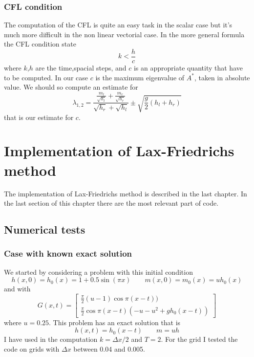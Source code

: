 \documentclass[oneside,12pt]{book}  %
\theoremstyle{plain}
\theoremstyle{definition}
\theoremstyle{remark}
\numberwithin{equation}{chapter} %
\begin{document}
\subsection{CFL condition}
The computation of the CFL is quite an easy task in the scalar case
but it's much more difficult in the non linear vectorial case. In the
more general formula the CFL condition state 
\begin{equation}
  \label{eq:cfl_condition}
  k<\frac{h}{c}
\end{equation}
where $k$,$h$ are the time,spacial steps, and $c$ is an appropriate
quantity that have to be computed. In our case $c$ is the maximum
eigenvalue of $A^*$, taken in absolute value. 
We should so compute an estimate for
\begin{equation}
  \label{eq:eiganvalues_bounded}
  \lambda_{1,2} = \frac{\frac{m_l}{\sqrt{h_l}}+\frac{m_r}{\sqrt{h_r}}
  }{\sqrt{h_r}+\sqrt{h_l}}\pm\sqrt{\frac{g}{2}(h_l+h_r)}
\end{equation}
that is our estimate for $c$. 



\chapter{Implementation of Lax-Friedrichs method}
\label{chap:1}
The implementation of Lax-Friedrichs method is described in the last
chapter. In the last section of this chapter there are the most relevant part of code.

\section{Numerical tests}
\subsection{Case with known exact solution}
\label{subsection:1_b}
We started by considering a problem with this initial condition
\begin{equation}
  \label{eq:initial_solution_1b}
  h(x,0)=h_0(x)=1+0.5\sin(\pi x)\quad \quad m(x,0)=m_0(x)=uh_0(x)
\end{equation}
and with
\begin{equation}
  \label{eq:known_term}
  G(x,t)=\begin{bmatrix} \frac{\pi}{2}(u-1)\cos\pi(x-t))\\
   \frac{\pi}{2}\cos\pi(x-t) \left(-u-u^2+gh_0(x-t)\right)\end{bmatrix}
\end{equation}
where $u=0.25$. 
This problem has an exact solution that is
\begin{equation}
  \label{eq:exact_solution}
  h(x,t)=h_0(x-t) \quad \quad m=uh
\end{equation}
I have used in the computation $k=\Delta x/2$ and $T=2$. For the grid
I tested the code on grids with $\Delta x$ between 0.04 and 0.005.
\end{document}
